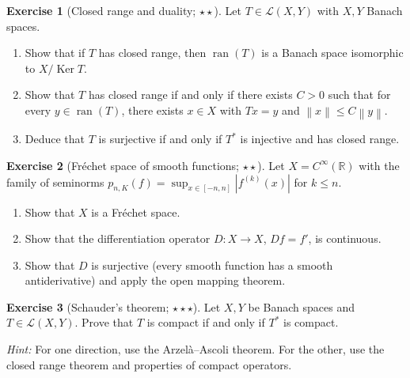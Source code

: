 \documentclass[a4paper,12pt]{book}
\DeclareMathOperator{\Ker}{Ker}
\DeclareMathOperator{\ran}{ran}
\newcommand{\R}{\mathbb{R}}
\newcommand{\norm}[1]{\left\| #1 \right\|}
\newcommand{\abs}[1]{\left| #1 \right|}
\theoremstyle{definition}
\newtheorem{exercise}{Exercise}[chapter]
\theoremstyle{plain}
\theoremstyle{remark}
\begin{document}
\begin{exercise}[Closed range and duality; $\star\star$]\label{ex:closed-range-dual}
Let $T \in \mathcal{L}(X,Y)$ with $X, Y$ Banach spaces.
\begin{enumerate}[label=(\alph*)]
  \item Show that if $T$ has closed range, then $\ran(T)$ is a Banach space isomorphic
    to $X/\Ker T$.
  \item Show that $T$ has closed range if and only if there exists $C > 0$ such that
    for every $y \in \ran(T)$, there exists $x \in X$ with $Tx = y$ and
    $\norm{x} \leq C\norm{y}$.
  \item Deduce that $T$ is surjective if and only if $T^*$ is injective and has
    closed range.
\end{enumerate}
\end{exercise}

\begin{exercise}[Fr\'echet space of smooth functions; $\star\star$]%
\label{ex:frechet-smooth}
Let $X = C^\infty(\R)$ with the family of seminorms
$p_{n,K}(f) = \sup_{x \in [-n,n]} \abs{f^{(k)}(x)}$ for $k \leq n$.
\begin{enumerate}[label=(\alph*)]
  \item Show that $X$ is a Fr\'echet space.
  \item Show that the differentiation operator $D \colon X \to X$, $Df = f'$, is
    continuous.
  \item Show that $D$ is surjective (every smooth function has a smooth antiderivative)
    and apply the open mapping theorem.
\end{enumerate}
\end{exercise}

\begin{exercise}[Schauder's theorem; $\star\star\star$]\label{ex:schauder-theorem}
Let $X, Y$ be Banach spaces and $T \in \mathcal{L}(X,Y)$. Prove that $T$ is
compact if and only if $T^*$ is compact.

\noindent\textit{Hint:} For one direction, use the Arzel\`a--Ascoli theorem. For the
other, use the closed range theorem and properties of compact operators.
\end{exercise}
\end{document}
